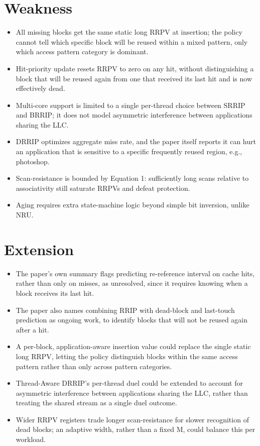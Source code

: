 \documentclass[10pt, conference]{IEEEtran}
\begin{document}
\section{Weakness}
\begin{itemize}[leftmargin=*, itemsep=0pt, topsep=1pt, parsep=0pt]
    \item All missing blocks get the same static long RRPV at insertion; the policy cannot tell which specific block will be reused within a mixed pattern, only which access pattern category is dominant.
    \item Hit-priority update resets RRPV to zero on any hit, without distinguishing a block that will be reused again from one that received its last hit and is now effectively dead.
    \item Multi-core support is limited to a single per-thread choice between SRRIP and BRRIP; it does not model asymmetric interference between applications sharing the LLC.
    \item DRRIP optimizes aggregate miss rate, and the paper itself reports it can hurt an application that is sensitive to a specific frequently reused region, e.g., photoshop.
    \item Scan-resistance is bounded by Equation 1: sufficiently long scans relative to associativity still saturate RRPVs and defeat protection.
    \item Aging requires extra state-machine logic beyond simple bit inversion, unlike NRU.
\end{itemize}

\section{Extension}
\begin{itemize}[leftmargin=*, itemsep=0pt, topsep=1pt, parsep=0pt]
    \item The paper's own summary flags predicting re-reference interval on cache hits, rather than only on misses, as unresolved, since it requires knowing when a block receives its last hit.
    \item The paper also names combining RRIP with dead-block and last-touch prediction as ongoing work, to identify blocks that will not be reused again after a hit.
    \item A per-block, application-aware insertion value could replace the single static long RRPV, letting the policy distinguish blocks within the same access pattern rather than only across pattern categories.
    \item Thread-Aware DRRIP's per-thread duel could be extended to account for asymmetric interference between applications sharing the LLC, rather than treating the shared stream as a single duel outcome.
    \item Wider RRPV registers trade longer scan-resistance for slower recognition of dead blocks; an adaptive width, rather than a fixed M, could balance this per workload.
\end{itemize}
\end{document}

